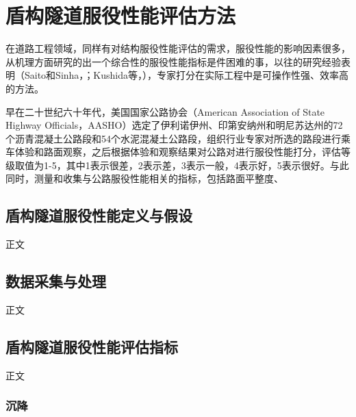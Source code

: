 \chapter{盾构隧道服役性能评估方法}

在道路工程领域，同样有对结构服役性能评估的需求，服役性能的影响因素很多，从机理方面研究的出一个综合性的服役性能指标是件困难的事，以往的研究经验表明（Saito和Sinha，\citeyear{saito1991delphi}；Kushida等，\citeyear{kushida1997development}），专家打分在实际工程中是可操作性强、效率高的方法。

早在二十世纪六十年代，美国国家公路协会（American Association of State Highway Officials，AASHO）选定了伊利诺伊州、印第安纳州和明尼苏达州的72个沥青混凝土公路段和54个水泥混凝土公路段，组织行业专家对所选的路段进行乘车体验和路面观察，之后根据体验和观察结果对公路对进行服役性能打分，评估等级取值为1-5，其中1表示很差，2表示差，3表示一般，4表示好，5表示很好。与此同时，测量和收集与公路服役性能相关的指标，包括路面平整度、

\section{盾构隧道服役性能定义与假设}

正文




\section{数据采集与处理}

正文





\section{盾构隧道服役性能评估指标}

正文




\subsection{沉降}





